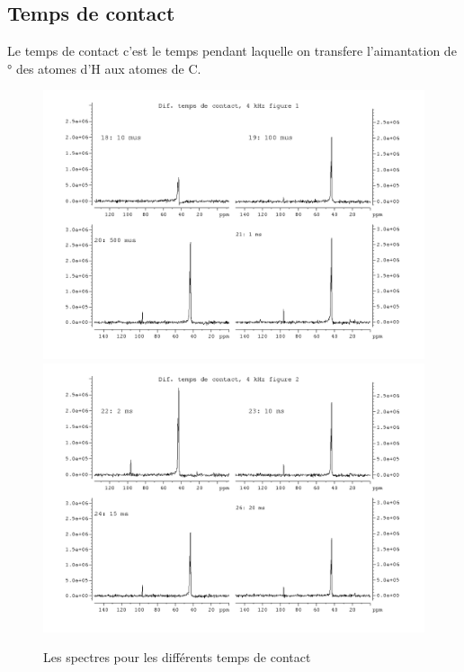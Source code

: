 \documentclass[a4paper,12pt]{scrartcl}
\begin{document}
  \subsection{Temps de contact}
   Le temps de contact c'est le temps pendant laquelle on transfere l'aimantation de \unit[90]{\degree} des atomes d'H aux atomes de C.
\begin{figure}[H]
    \includegraphics[width=\textwidth]{bilder/figure3.png}
    \includegraphics[width=\textwidth]{bilder/figure4.png}
    \caption{Les spectres pour les différents temps de contact}
   \end{figure}
\end{document}
